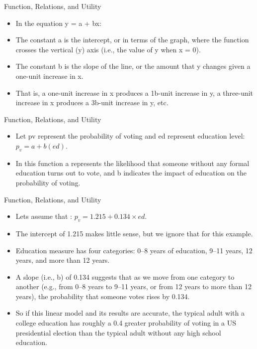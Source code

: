 \documentclass[
  ignorenonframetext,
]{beamer}
\begin{document}
\begin{frame}{Function, Relations, and Utility}
\protect\hypertarget{function-relations-and-utility-5}{}

\begin{itemize}
\item
  In the equation y = a + bx:
\item
  The constant a is the intercept, or in terms of the graph, where the
  function crosses the vertical (y) axis (i.e., the value of y when x =
  0).
\item
  The constant b is the slope of the line, or the amount that y changes
  given a one-unit increase in x.
\item
  That is, a one-unit increase in x produces a 1b-unit increase in y, a
  three-unit increase in x produces a 3b-unit increase in y, etc.
\end{itemize}

\end{frame}

\begin{frame}{Function, Relations, and Utility}
\protect\hypertarget{function-relations-and-utility-6}{}

\begin{itemize}
\item
  Let pv represent the probability of voting and ed represent education
  level: \(p_{v} = a+b(ed)\).
\item
  In this function a represents the likelihood that someone without any
  formal education turns out to vote, and b indicates the impact of
  education on the probability of voting.
\end{itemize}

\end{frame}

\begin{frame}{Function, Relations, and Utility}
\protect\hypertarget{function-relations-and-utility-7}{}

\begin{itemize}
\item
  Lets assume that : \(p_{v} = 1.215 + 0.134 × ed\).
\item
  The intercept of 1.215 makes little sense, but we ignore that for this
  example.
\item
  Education measure has four categories: 0--8 years of education, 9--11
  years, 12 years, and more than 12 years.
\item
  A slope (i.e., b) of 0.134 suggests that as we move from one category
  to another (e.g., from 0--8 years to 9--11 years, or from 12 years to
  more than 12 years), the probability that someone votes rises by
  0.134.
\item
  So if this linear model and its results are accurate, the typical
  adult with a college education has roughly a 0.4 greater probability
  of voting in a US presidential election than the typical adult without
  any high school education.
\end{itemize}

\end{frame}
\end{document}
